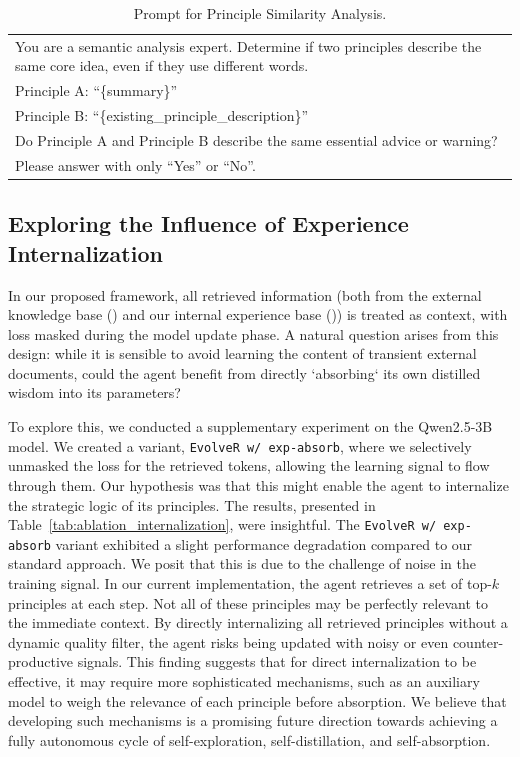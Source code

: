 \begin{table}[ht]
  \centering
  \small
  \label{tab:match_principle_prompt}
  \caption{Prompt for Principle Similarity Analysis.}
  \begin{tabular}{p{}}
    \toprule
You are a semantic analysis expert. Determine if two principles describe the same core idea, even if they use different words.\\[0.5em]

Principle A: ``\{summary\}''\\
Principle B: ``\{existing\_principle\_description\}''\\[0.5em]

Do Principle A and Principle B describe the same essential advice or warning?\\
Please answer with only ``Yes'' or ``No''.\\
    \bottomrule
  \end{tabular}
\end{table}





\subsection{Exploring the Influence of Experience Internalization}

In our proposed framework, all retrieved information (both from the external knowledge base () and our internal experience base ()) is treated as context, with loss masked during the model update phase. A natural question arises from this design: while it is sensible to avoid learning the content of transient external documents, could the agent benefit from directly `absorbing` its own distilled wisdom into its parameters?

To explore this, we conducted a supplementary experiment on the Qwen2.5-3B model. We created a variant, \texttt{EvolveR w/ exp-absorb}, where we selectively unmasked the loss for the retrieved  tokens, allowing the learning signal to flow through them. Our hypothesis was that this might enable the agent to internalize the strategic logic of its principles. The results, presented in Table~\ref{tab:ablation_internalization}, were insightful. The \texttt{EvolveR w/ exp-absorb} variant exhibited a slight performance degradation compared to our standard approach. We posit that this is due to the challenge of noise in the training signal. In our current implementation, the agent retrieves a set of top-$k$ principles at each step. Not all of these principles may be perfectly relevant to the immediate context. By directly internalizing all retrieved principles without a dynamic quality filter, the agent risks being updated with noisy or even counter-productive signals. This finding suggests that for direct internalization to be effective, it may require more sophisticated mechanisms, such as an auxiliary model to weigh the relevance of each principle before absorption. We believe that developing such mechanisms is a promising future direction towards achieving a fully autonomous cycle of self-exploration, self-distillation, and self-absorption.

